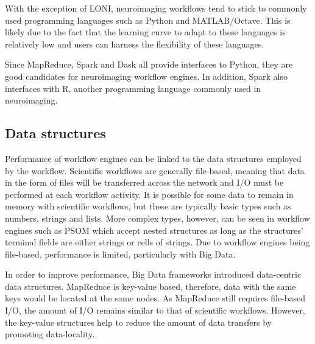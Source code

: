            With the exception of LONI, neuroimaging workflows tend to stick to
            commonly used programming languages such as Python and
            MATLAB/Octave. This is likely due to the fact that the learning
            curve to adapt to these languages is relatively low and users can
            harness the flexibility of these languages. 
            
            Since MapReduce, Spark and Dask all provide interfaces to Python,  
            they are good candidates for neuroimaging workflow engines. In
            addition, Spark also interfaces with R, another programming language
            commonly used in neuroimaging.

            \subsection{Data structures}\label{ds}
                
                Performance of workflow engines can be linked to the data
                structures employed by the workflow. Scientific workflows are
                generally file-based, meaning that data in the form of files
                will be transferred across the network and I/O must be performed
                at each workflow activity. It is possible for some data to
                remain in memory with scientific workflows, but these are
                typically basic types such as numbers, strings and lists. More
                complex types, however, can be seen in workflow engines such as
                PSOM which accept nested structures as long as the structures'
                terminal fields are either strings or cells of strings. Due to
                workflow engines being file-based, performance is limited,
                particularly with Big Data.
                
                In order to improve performance, Big Data frameworks introduced
                data-centric data structures. MapReduce is key-value based,
                therefore, data with the same keys would be located at the same
                nodes. As MapReduce still requires file-based I/O, the amount of
                I/O remains similar to that of scientific workflows. However,
                the key-value structures help to reduce the amount of data
                transfers by promoting data-locality.

